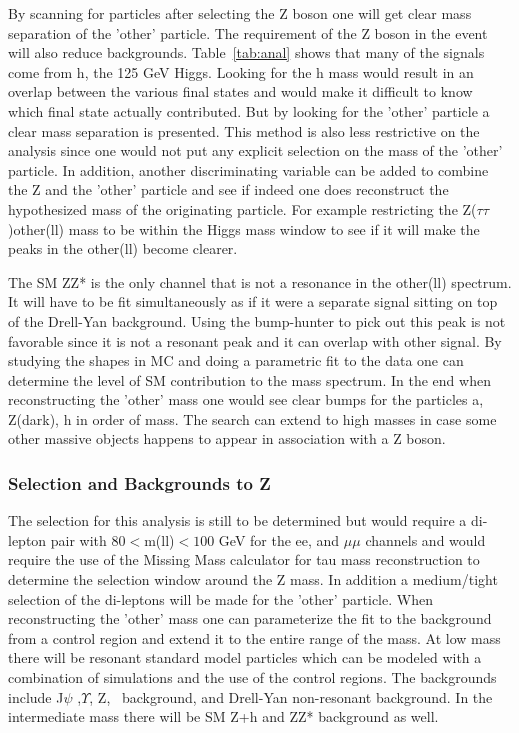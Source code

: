 By scanning for particles after selecting the Z boson one will get clear mass separation of the 'other' particle. The requirement of the Z boson in the event will also reduce backgrounds.  Table~\ref{tab:anal} shows that many of the signals come from h, the 125 GeV Higgs.  Looking for the h mass would result in an overlap between the various final states and  would make it difficult to know which final
state actually contributed.  But by looking for the 'other' particle a clear mass separation is presented.  This method is also less restrictive on the analysis since one would not put any explicit selection on the mass
of the 'other' particle. In addition, another discriminating variable can be added to combine the Z and the 'other' particle and see if indeed one does reconstruct the hypothesized mass of the originating particle.  For example restricting the Z($\tau\tau$)other(ll) mass to be within the Higgs mass window to see if it will make the peaks in the other(ll) become clearer.  

The SM ZZ* is the only channel that is not a resonance in the other(ll) spectrum.  It will have to be fit simultaneously as if it were a separate signal sitting on top of the Drell-Yan background.  Using the
bump-hunter to pick out this peak is not favorable since it is not a resonant peak and it can overlap with other signal.  By studying the shapes in MC and doing a parametric fit to the data one can determine the level of SM contribution to the mass spectrum.
In the end when reconstructing the 'other' mass one would see clear bumps for the particles a, Z(dark), h in order of mass. The search can extend to high masses in case some other massive objects happens to appear in association with a Z boson.  


\subsubsection{Selection and Backgrounds to Z }
\label{sec:zscanback}
The selection for this analysis is still to be determined but would require a di-lepton pair with $80<$m(ll)$<100$ GeV for the ee, and $\mu\mu$ channels and would require the use of the Missing Mass calculator for tau mass
reconstruction to determine the selection window around the Z mass.  In addition a medium/tight selection of the di-leptons will be made for the 'other' particle. 
When reconstructing the 'other' mass one can parameterize the fit to the background from a control region and extend it to the entire range of the mass.  At low mass there will be resonant standard model particles which can be modeled with a combination of simulations and the use of the control regions.
The backgrounds include J$\psi$ ,$\Upsilon$, Z, \ttbar\ background, and Drell-Yan non-resonant background. In the intermediate mass there will be SM Z+h and ZZ* background as well.


